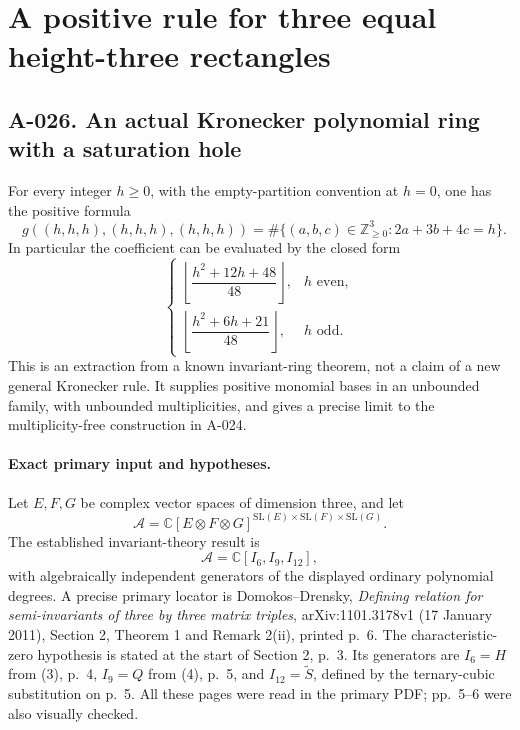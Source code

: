 \section{A positive rule for three equal height-three rectangles}

\subsection*{A-026. An actual Kronecker polynomial ring with a saturation hole}
For every integer $h\geq0$, with the empty-partition convention
at $h=0$, one has the positive formula
\[
 \boxed{\quad
 g((h,h,h),(h,h,h),(h,h,h))
    =\#\{(a,b,c)\in\mathbb Z_{\geq0}^3:2a+3b+4c=h\}.
 \quad}                                                 \tag{A-026.1}
\]
In particular the coefficient can be evaluated by the closed form
\[
 \begin{cases}
 \left\lfloor\dfrac{h^2+12h+48}{48}\right\rfloor,&h\text{ even},\\[3pt]
 \left\lfloor\dfrac{h^2+6h+21}{48}\right\rfloor,&h\text{ odd}.
 \end{cases}                                             \tag{A-026.2}
\]
This is an extraction from a known invariant-ring theorem,
not a claim of a new general Kronecker rule. It supplies
positive monomial bases in an unbounded family, with
unbounded multiplicities, and gives a precise limit to the
multiplicity-free construction in A-024.

\paragraph{Exact primary input and hypotheses.}
Let $E,F,G$ be complex vector spaces of dimension three,
and let
\[
       \mathcal A=\mathbb C[E\otimes F\otimes G]
                  ^{\mathrm{SL}(E)\times\mathrm{SL}(F)\times\mathrm{SL}(G)}.
\]
The established invariant-theory result is
\[
                  \mathcal A=\mathbb C[I_6,I_9,I_{12}],           \tag{A-026.3}
\]
with algebraically independent generators of the displayed
ordinary polynomial degrees. A precise primary locator is
Domokos--Drensky, \emph{Defining relation for semi-invariants
of three by three matrix triples}, arXiv:1101.3178v1
(17 January 2011), Section 2, Theorem 1 and Remark 2(ii),
printed p.~6. The characteristic-zero hypothesis is stated
at the start of Section 2, p.~3. Its generators are
$I_6=H$ from (3), p.~4, $I_9=Q$ from (4), p.~5,
and $I_{12}=\widetilde S$, defined by the ternary-cubic
substitution on p.~5. All these pages were read in the
primary PDF; pp.~5--6 were also visually checked.

